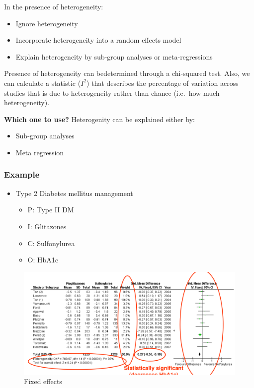 \documentclass[
]{book}
\providecommand{\tightlist}{%
  \setlength{\itemsep}{0pt}\setlength{\parskip}{0pt}}
\begin{document}
In the presence of heterogeneity:

\begin{itemize}
\tightlist
\item
  Ignore heterogeneity
\item
  Incorporate heterogeneity into a random effects model
\item
  Explain heterogeneity by sub-group analyses or meta-regressions
\end{itemize}

Presence of heterogeneity can bedetermined through a chi-squared test. Also, we can calculate a statistic (\(I^2\)) that describes the percentage of
variation across studies that is due to heterogeneity rather than chance (i.e.~how much heterogeneity).

\textbf{Which one to use?} Heterogenity can be explained either by:

\begin{itemize}
\tightlist
\item
  Sub-group analyses
\item
  Meta regression
\end{itemize}

\hypertarget{example}{%
\subsubsection{Example}\label{example}}

\begin{itemize}
\tightlist
\item
  Type 2 Diabetes mellitus management

  \begin{itemize}
  \tightlist
  \item
    P: Type II DM
  \item
    I: Glitazones
  \item
    C: Sulfonylurea
  \item
    O: HbA1c
  \end{itemize}
\end{itemize}

\begin{figure}

{\centering \includegraphics[width=18.08in]{images/fixed_example} 

}

\caption{Fixed effects}\label{fig:unnamed-chunk-5}
\end{figure}
\end{document}
